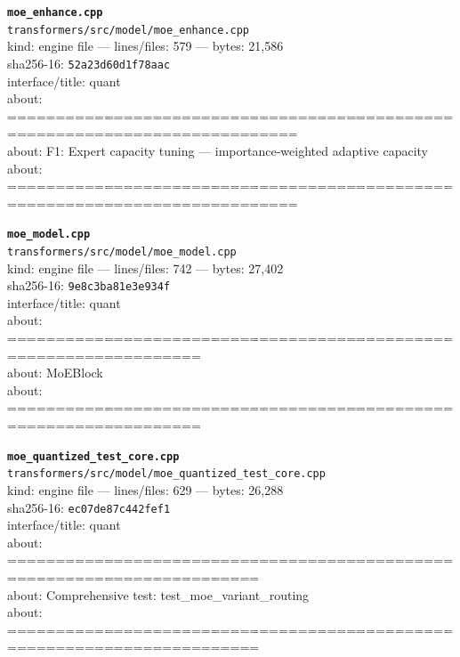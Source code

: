 \noindent\textbf{\texttt{moe\_enhance.cpp}}\\
\texttt{transformers/src/model/moe\_enhance.cpp}\\
kind: engine file --- lines/files: 579 --- bytes: 21,586\\
sha256-16: \texttt{52a23d60d1f78aac}\\
interface/title: quant\\
about: ============================================================================\\
about: F1: Expert capacity tuning — importance-weighted adaptive capacity\\
about: ============================================================================\\
\vspace*{6.0pt}

\noindent\textbf{\texttt{moe\_model.cpp}}\\
\texttt{transformers/src/model/moe\_model.cpp}\\
kind: engine file --- lines/files: 742 --- bytes: 27,402\\
sha256-16: \texttt{9e8c3ba81e3e934f}\\
interface/title: quant\\
about: ==================================================================\\
about: MoEBlock\\
about: ==================================================================\\
\vspace*{6.0pt}
\newpage

\noindent\textbf{\texttt{moe\_quantized\_test\_core.cpp}}\\
\texttt{transformers/src/model/moe\_quantized\_test\_core.cpp}\\
kind: engine file --- lines/files: 629 --- bytes: 26,288\\
sha256-16: \texttt{ec07de87c442fef1}\\
interface/title: quant\\
about: ========================================================================\\
about: Comprehensive test: test\_moe\_variant\_routing\\
about: ========================================================================\\
\vspace*{6.0pt}


